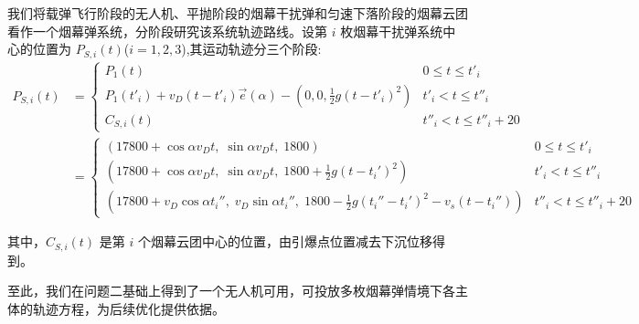 \documentclass[withoutpreface,bwprint]{cumcmthesis}
\numberwithin{equation}{section} %
\numberwithin{figure}{section} %
\numberwithin{table}{section}  %
\begin{document}
我们将载弹飞行阶段的无人机、平抛阶段的烟幕干扰弹和匀速下落阶段的烟幕云团看作一个烟幕弹系统，分阶段研究该系统轨迹路线。设第 $i$ 枚烟幕干扰弹系统中心的位置为 ${P}_{S,i}(t)$($i=1, 2, 3$),其运动轨迹分三个阶段:
\begin{equation}
\begin{split}
{P}_{S,i}(t) &= 
\begin{cases}
    {P}_{1}(t) &  0 \le t \le t'_i \\
    {P}_{1}(t'_i) + v_D (t - t'_i) \vec{e}(\alpha) - (0, 0, \frac{1}{2}g(t - t'_i)^2) & t'_i < t \le t''_i \\
    {C}_{S,i}(t) &  t''_i < t \le t''_i + 20
\end{cases}\\
&=\begin{cases}
(17800\!+\!\cos{\alpha}v_Dt,\; \sin{\alpha}v_Dt,\; 1800) & 0 \le t \le t'_i \\[0.3ex]
(17800\!+\!\cos{\alpha}v_Dt,\; \sin{\alpha}v_Dt,\; 1800\!+\!\tfrac{1}{2}g(t\!-\!t_i')^2) & t'_i < t \le t''_i \\[0.3ex]
(17800\!+\!v_D\cos{\alpha}t_i'',\; v_D\sin{\alpha}t_i'',\; 1800\!-\!\tfrac{1}{2}g(t_i''\!-\!t_i')^2\!-\!v_s(t\!-\!t_i'')) & t''_i < t \le t''_i + 20
\end{cases}
\end{split}
\end{equation}

其中，${C}_{S,i}(t)$ 是第 $i$ 个烟幕云团中心的位置，由引爆点位置减去下沉位移得到。

至此，我们在问题二基础上得到了一个无人机可用，可投放多枚烟幕弹情境下各主体的轨迹方程，为后续优化提供依据。



\vspace{-0.5em}
\end{document}
